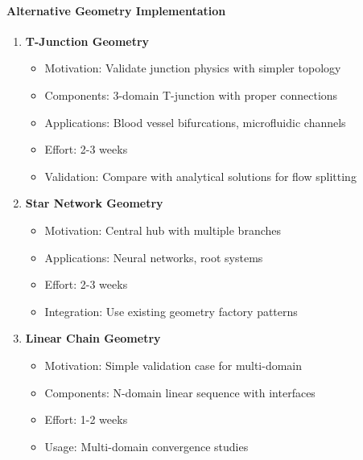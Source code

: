 \paragraph{Alternative Geometry Implementation}
\begin{enumerate}
    \item \textbf{T-Junction Geometry}
    \begin{itemize}
        \item Motivation: Validate junction physics with simpler topology
        \item Components: 3-domain T-junction with proper connections
        \item Applications: Blood vessel bifurcations, microfluidic channels
        \item Effort: 2-3 weeks
        \item Validation: Compare with analytical solutions for flow splitting
    \end{itemize}
    
    \item \textbf{Star Network Geometry}
    \begin{itemize}
        \item Motivation: Central hub with multiple branches
        \item Applications: Neural networks, root systems
        \item Effort: 2-3 weeks
        \item Integration: Use existing geometry factory patterns
    \end{itemize}
    
    \item \textbf{Linear Chain Geometry}
    \begin{itemize}
        \item Motivation: Simple validation case for multi-domain
        \item Components: N-domain linear sequence with interfaces
        \item Effort: 1-2 weeks
        \item Usage: Multi-domain convergence studies
    \end{itemize}
\end{enumerate}

